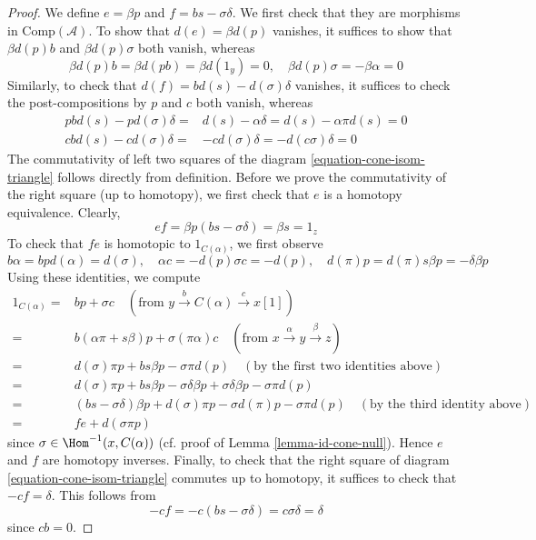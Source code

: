 \begin{proof}
\medskip\noindent
We define $e=\beta p$ and $f=bs-\sigma\delta$. We first check that they are
morphisms in $\text{Comp}(\mathcal{A})$. To show that $d(e)=\beta d(p)$
vanishes, it suffices to show that $\beta d(p)b$ and $\beta d(p)\sigma$
both vanish, whereas
$$
\beta d(p)b = \beta d(pb) = \beta d(1_y) = 0,\quad
\beta d(p)\sigma = -\beta\alpha = 0
$$
Similarly, to check that $d(f)=bd(s)-d(\sigma)\delta$ vanishes,
it suffices to check the post-compositions by $p$ and $c$ both vanish,
whereas
\begin{align*}
pbd(s) - pd(\sigma)\delta
= &
d(s)-\alpha\delta = d(s)-\alpha\pi d(s) = 0 \\
cbd(s)-cd(\sigma)\delta
= &
-cd(\sigma)\delta = -d(c\sigma)\delta = 0
\end{align*}
The commutativity of left two squares of the
diagram \ref{equation-cone-isom-triangle} follows directly from definition.
Before we prove the commutativity of the right square (up to homotopy),
we first check that $e$ is a homotopy equivalence. Clearly,
$$
ef=\beta p (bs-\sigma\delta)=\beta s=1_z
$$
To check that $fe$ is homotopic to $1_{C(\alpha)}$, we first observe
$$
b\alpha = bpd(\alpha) = d(\sigma),\quad
\alpha c = -d(p)\sigma c = -d(p),\quad
d(\pi)p = d(\pi)s\beta p = -\delta\beta p
$$
Using these identities, we compute
\begin{align*}
1_{C(\alpha)} = &
bp + \sigma c
\quad (\text{from }y \xrightarrow{b} C(\alpha) \xrightarrow{c} x[1]) \\
= &
b(\alpha\pi + s\beta)p + \sigma(\pi\alpha)c
\quad (\text{from }x \xrightarrow{\alpha} y \xrightarrow{\beta} z) \\
= &
d(\sigma)\pi p + bs\beta p - \sigma\pi d(p)
\quad (\text{by the first two identities above}) \\
= &
d(\sigma)\pi p + bs\beta p - \sigma\delta\beta p
+ \sigma\delta\beta p - \sigma\pi d(p) \\
= &
(bs - \sigma\delta)\beta p + d(\sigma)\pi p
- \sigma d(\pi)p - \sigma\pi d(p)\quad
(\text{by the third identity above}) \\
= &
fe + d(\sigma \pi p)
\end{align*}
since $\sigma \in \Hom^{-1}(x, C(\alpha))$
(cf. proof of Lemma \ref{lemma-id-cone-null}).
Hence $e$ and $f$ are homotopy inverses.
Finally, to check that the right square of
diagram \ref{equation-cone-isom-triangle} commutes up to homotopy,
it suffices to check that $-cf=\delta$. This follows from
$$
-cf = -c(bs-\sigma\delta) = c\sigma\delta = \delta
$$
since $cb=0$.


\end{proof}
